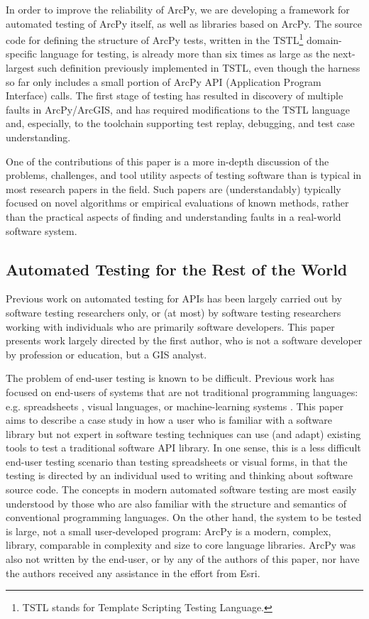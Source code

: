 In order to improve the reliability of ArcPy, we are developing a
framework for automated testing of ArcPy itself, as well as libraries
based on ArcPy.  The source code for defining the structure of ArcPy
tests, written in the TSTL\footnote{TSTL stands for Template Scripting
  Testing Language.}\cite{NFM15,ISSTA14,tstl} domain-specific
language \cite{Fow10} for testing, is already more than six times as
large as the next-largest such definition previously implemented in
TSTL, even though the harness so far only includes a small portion of ArcPy
API (Application Program Interface) calls. The first stage of testing has resulted in discovery of
multiple faults in ArcPy/ArcGIS, and has required modifications to the
TSTL language and, especially, to the toolchain supporting test replay,
debugging, and test case understanding.

One of the contributions of this paper is a more in-depth discussion
of the problems, challenges, and tool utility aspects of testing
software than is typical in most research papers in the field.  Such
papers are (understandably) typically focused on novel algorithms or
empirical evaluations of known methods, rather than the practical aspects of finding
and understanding faults in a real-world software system.


\subsection{Automated Testing for the Rest of the World}

Previous work on automated testing for APIs has been largely carried
out by software testing researchers only, or (at most) by software
testing researchers working with individuals who are primarily
software developers.  This paper presents work largely directed by
the first author, who is not a software developer by
profession or education, but a GIS analyst.  

The problem of end-user testing
\cite{burnettEUSE,Silos,rothermelTOSEM} is known to be difficult.
Previous work has focused on end-users of systems that are not
traditional programming languages: e.g. spreadsheets \cite{rothermelTOSEM}, visual
languages, or machine-learning systems \cite{OnlyOracle}.  This paper aims to describe a
case study in how a user who is familiar with a software library but
not expert in software testing techniques can use (and adapt) existing
tools to test a traditional software API library.  In one sense, this
is a less difficult end-user testing scenario than testing
spreadsheets or visual forms, in that the testing is directed by an
individual used to writing and thinking about software source code.
The concepts in modern automated software testing are most easily
understood by those who are also familiar with the structure and semantics of
conventional programming languages.  On the other hand, the system to
be tested is large, not a small user-developed program: ArcPy is
a modern, complex, library, comparable in complexity and size to
core language libraries.   ArcPy was also not written by the end-user,
or by any of the authors of this paper, nor have the authors received
any  assistance in the effort from Esri.

